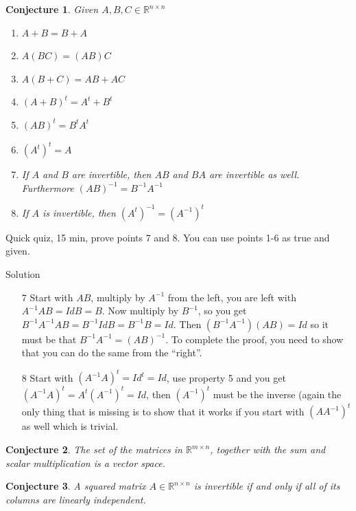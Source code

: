 \documentclass[aspectratio=169]{beamer}
\newtheorem{proposition}{Conjecture}[section]
\begin{document}
\begin{frame}
    \begin{proposition}
        Given $A,B,C\in\mathbb{R}^{n\times n}$
        
        \begin{enumerate}
            \item $A+B=B+A$
            \item $A(BC)=(AB)C$
            \item $A(B+C)=AB+AC$
            \item $(A+B)^t = A^t+B^t$
            \item $(AB)^t=B^tA^t$
            \item $(A^t)^t=A$
            \item If $A$ and $B$ are invertible, then $AB$ and $BA$ are invertible as well. Furthermore $(AB)^{-1}=B^{-1}A^{-1}$
            \item If $A$ is invertible, then $(A^t)^{-1}=(A^{-1})^t$
        \end{enumerate}
    \end{proposition}
\end{frame}

\begin{frame}
    Quick quiz, 15 min, prove points 7 and 8. You can use points 1-6 as true and given.
\end{frame}

\begin{frame}{Solution}
    \begin{enumerate}
    
    \item[7] Start with $AB$, multiply by $A^{-1}$ from the left, you are left with $A^{-1}AB = Id B = B$. Now multiply by $B^{-1}$, so you get $B^{-1}A^{-1}AB = B^{-1}IdB=B^{-1}B=Id$. Then $(B^{-1}A^{-1})(AB) = Id$ so it must be that $B^{-1}A^{-1}=(AB)^{-1}$. To complete the proof, you need to show that you can do the same from the ``right''.
    
    \item[8] Start with $(A^{-1}A)^t = Id ^t = Id$, use property 5 and you get $(A^{-1}A)^t = A^t (A^{-1})^t = Id$, then $(A^{-1})^t$ must be the inverse (again the only thing that is missing is to show that it works if you start with $(A A^{-1})^t$ as well which is trivial.
    
    \end{enumerate}
\end{frame}

\begin{frame}
\begin{proposition}
    The set of the matrices in $\mathbb{R}^{m\times n}$, together with the sum and scalar multiplication is a vector space.    
\end{proposition}

\begin{proposition}
A squared matrix $A\in\mathbb{R}^{n\times n}$ is invertible if and only if all of its columns are linearly independent.
\end{proposition}
\end{frame}
\end{document}
